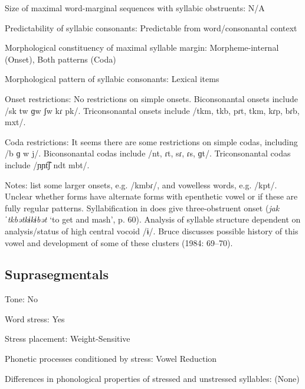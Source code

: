 {\begin{appendixdesc}
\item[Size of maximal word-marginal sequences with syllabic obstruents:] N/A

\item[Predictability of syllabic consonants:] Predictable from word/consonantal context

\item[Morphological constituency of maximal syllable margin:] Morpheme-internal (Onset), Both patterns (Coda)

\item[Morphological pattern of syllabic consonants:] Lexical items

\item[Onset restrictions:] No restrictions on simple onsets. Biconsonantal onsets include /sk tw ɡw ʃw kɾ pk/. Triconsonantal onsets include /tkm, tkb, pɾt, tkm, kɾp, bɾb, mxt/.

\item[Coda restrictions:] It seems there are some restrictions on simple codas, including /b ɡ w j/. Biconsonantal codas include /nt, ɾt, sɾ, ɾs, ɡt/. Triconsonantal codas include /ɲɲt͡ʃ ndt mbt/.

\item[Notes:] \citet{EdmistonEdmiston2003} list some larger onsets, e.g. /kmbɾ/, and vowelless words, e.g. /kpt/. Unclear whether forms have alternate forms with epenthetic vowel or if these are fully regular patterns. Syllabification in \citet{Bruce1984} does give three-obstruent onset (\textit{jakˈtkbətkɨkɨbət} ‘to get and mash’, p. 60). Analysis of syllable structure dependent on analysis/status of high central vocoid /ɨ/. Bruce discusses possible history of this vowel and development of some of these clusters (1984: 69--70).
\end{appendixdesc}
\subsection*{Suprasegmentals}
\begin{appendixdesc}
\item[Tone:] No

\item[Word stress:] Yes

\item[Stress placement:] Weight-Sensitive

\item[Phonetic processes conditioned by stress:] Vowel Reduction

\item[Differences in phonological properties of stressed and unstressed syllables:] (None)


\end{appendixdesc}}
